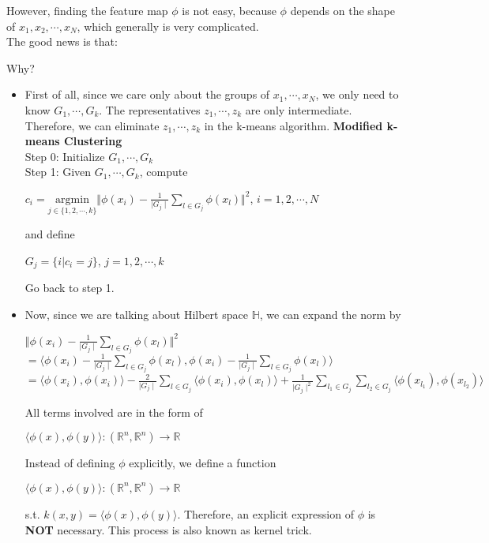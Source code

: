 \documentclass{article}
\begin{document}
\pagebreak
However, finding the feature map $\phi$ is not easy, because $\phi$ depends on the shape of $x_1,x_2,\cdots,x_N$, which generally is very complicated. \\
The good news is that:
\begin{center}
\end{center}
Why?
\begin{itemize}
    \item First of all, since we care only about the groups of $x_1, \cdots, x_N$, we only need to know $G_1, \cdots, G_k$. The representatives $z_1, \cdots, z_k$ are only intermediate. Therefore, we can eliminate $z_1, \cdots, z_k$ in the k-means algorithm. 
    \bigbreak
    \textbf{Modified k-means Clustering} \\
    Step 0: Initialize $G_1, \cdots, G_k$ \\
    Step 1: Given $G_1, \cdots, G_k$, compute
\begin{center}
    $c_i = \underset{j \in \{1,2,\cdots,k\}}{\text{argmin}}\Vert \phi(x_i) - \frac{1}{\mid{G_j}\mid} \sum_{l \in G_j} \phi(x_l) \Vert^{2}$, $i = 1,2, \cdots, N$ 
\end{center}
and define 
\begin{center}
    $G_j = \{i|c_i = j\}$, $j = 1,2, \cdots, k$
\end{center}
Go back to step 1.
\item Now, since we are talking about Hilbert space $\mathbb{H}$, we can expand the norm by 
\begin{center}
    $\Vert \phi(x_i) - \frac{1}{\mid{G_j}\mid} \sum_{l \in G_j} \phi(x_l) \Vert^{2}$ \\
    $= \langle \phi(x_i) - \frac{1}{\mid{G_j}\mid} \sum_{l \in G_j} \phi(x_l), \phi(x_i) - \frac{1}{\mid{G_j}\mid} \sum_{l \in G_j} \phi(x_l) \rangle$ \\
    $= \langle \phi(x_i), \phi(x_i) \rangle - \frac{2}{\mid G_j \mid} \sum_{l \in G_j} \langle \phi(x_i), \phi(x_l) \rangle + \frac{1}{\mid G_j \mid^2} \sum_{l_1 \in G_j} \sum_{l_2 \in G_j} \langle \phi(x_{l_1}), \phi(x_{l_2}) \rangle$  
    
\end{center}
All terms involved are in the form of 
\begin{center}
    $\langle \phi(x), \phi(y) \rangle : (\mathbb{R}^{n}, \mathbb{R}^{n}) \to \mathbb{R}$
\end{center}
 
Instead of defining $\phi$ explicitly, we define a function 
\begin{center}
     $\langle \phi(x), \phi(y) \rangle : (\mathbb{R}^{n}, \mathbb{R}^{n}) \to \mathbb{R}$ 
\end{center}
s.t. $k(x,y) = \langle \phi(x), \phi(y) \rangle$. 
\bigbreak
Therefore, an explicit expression of $\phi$ is \textbf{NOT} necessary. This process is also known as kernel trick. 
\end{itemize}
\end{document}
